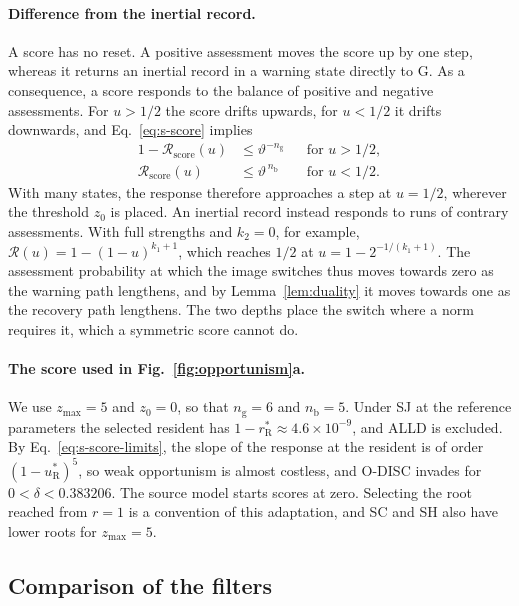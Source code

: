 \documentclass[10pt]{wlscirep}
\newcommand{\Rmap}{\mathscr{R}}            %
\newcommand{\rR}{r_{\mathrm{R}}^{*}}
\newcommand{\uR}{u_{\mathrm{R}}^{*}}
\theoremstyle{plain}
\theoremstyle{remark}
\begin{document}
\paragraph{Difference from the inertial record.} A score has no reset. A positive assessment moves the score up by one step, whereas it returns an inertial record in a warning state directly to G. As a consequence, a score responds to the balance of positive and negative assessments. For $u>1/2$ the score drifts upwards, for $u<1/2$ it drifts downwards, and Eq.~\eqref{eq:s-score} implies
\begin{equation}
\begin{aligned}
1-\Rmap_{\mathrm{score}}(u)&\leq \vartheta^{-n_{\mathrm g}} && \text{for } u>1/2,\\
\Rmap_{\mathrm{score}}(u)&\leq \vartheta^{\,n_{\mathrm b}} && \text{for } u<1/2.
\end{aligned}
\label{eq:s-score-step}
\end{equation}
With many states, the response therefore approaches a step at $u=1/2$, wherever the threshold $z_0$ is placed. An inertial record instead responds to runs of contrary assessments. With full strengths and $k_2=0$, for example, $\Rmap(u)=1-(1-u)^{k_1+1}$, which reaches $1/2$ at $u=1-2^{-1/(k_1+1)}$. The assessment probability at which the image switches thus moves towards zero as the warning path lengthens, and by Lemma~\ref{lem:duality} it moves towards one as the recovery path lengthens. The two depths place the switch where a norm requires it, which a symmetric score cannot do.

\paragraph{The score used in Fig.~\ref{fig:opportunism}a.} We use $z_{\max}=5$ and $z_0=0$, so that $n_{\mathrm g}=6$ and $n_{\mathrm b}=5$. Under SJ at the reference parameters the selected resident has $1-\rR\approx4.6\times10^{-9}$, and ALLD is excluded. By Eq.~\eqref{eq:s-score-limits}, the slope of the response at the resident is of order $(1-\uR)^{5}$, so weak opportunism is almost costless, and O-DISC invades for $0<\delta<0.383206$. The source model starts scores at zero. Selecting the root reached from $r=1$ is a convention of this adaptation, and SC and SH also have lower roots for $z_{\max}=5$.

\subsection{Comparison of the filters}
\end{document}
